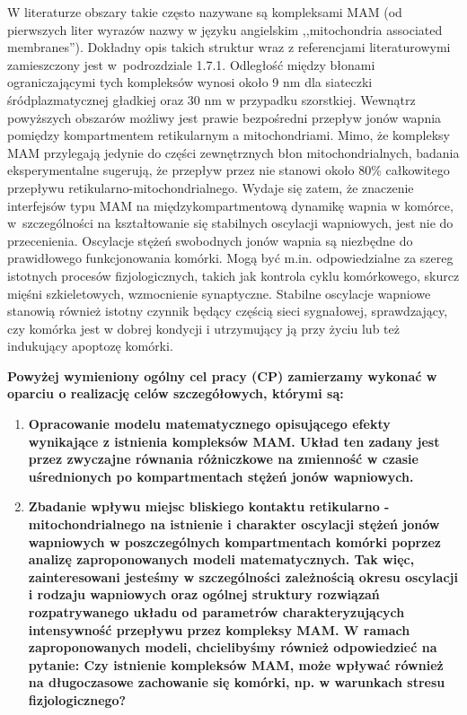 W literaturze obszary takie często nazywane są kompleksami MAM (od pierwszych liter wyrazów nazwy w języku angielskim ,,mitochondria associated membranes''). Dokładny opis takich struktur wraz z referencjami literaturowymi  zamieszczony jest w~podrozdziale 1.7.1. Odległość między błonami ograniczającymi tych kompleksów wynosi około 9 nm dla siateczki śródplazmatycznej gładkiej oraz 30 nm w przypadku szorstkiej. Wewnątrz powyższych obszarów możliwy jest prawie bezpośredni przepływ jonów wapnia pomiędzy kompartmentem retikularnym a mitochondriami. Mimo, że kompleksy MAM przylegają jedynie do części zewnętrznych błon mitochondrialnych, badania eksperymentalne sugerują, że przepływ przez nie stanowi około 80\% całkowitego przepływu retikularno-mitochondrialnego. Wydaje się zatem, że znaczenie interfejsów typu MAM na międzykompartmentową dynamikę wapnia w komórce, w~szczególności na kształtowanie się stabilnych oscylacji wapniowych,  jest nie do przecenienia. Oscylacje stężeń swobodnych  jonów wapnia  są niezbędne do prawidłowego funkcjonowania komórki. Mogą być m.in. odpowiedzialne za szereg istotnych procesów fizjologicznych, takich jak kontrola cyklu komórkowego, skurcz mięśni szkieletowych, wzmocnienie synaptyczne. Stabilne oscylacje wapniowe stanowią również istotny czynnik będący częścią  sieci sygnałowej, sprawdzający, czy komórka jest w dobrej kondycji i utrzymujący ją przy życiu lub też indukujący apoptozę komórki. 

\bigskip

\textbf{Powyżej wymieniony ogólny cel pracy (CP)  zamierzamy wykonać w oparciu o realizację celów szczegółowych, którymi są:}

\begin{enumerate}
\item \textbf{Opracowanie modelu matematycznego opisującego efekty wynikające z istnienia kompleksów MAM.  Układ ten zadany jest  przez zwyczajne równania różniczkowe na zmienność w czasie uśrednionych po kompartmentach stężeń jonów wapniowych. }

\item \textbf{Zbadanie wpływu miejsc bliskiego kontaktu retikularno - mitochondrialnego na istnienie i charakter oscylacji stężeń jonów wapniowych w poszczególnych kompartmentach  komórki poprzez analizę zaproponowanych modeli matematycznych.  Tak więc, zainteresowani jesteśmy  w szczególności  zależnością  okresu  oscylacji i rodzaju wapniowych oraz ogólnej struktury rozwiązań rozpatrywanego układu od parametrów charakteryzujących intensywność przepływu przez kompleksy MAM. W ramach zaproponowanych modeli, chcielibyśmy również odpowiedzieć na pytanie: Czy istnienie kompleksów MAM, może wpływać również na długoczasowe zachowanie się komórki, np.  w warunkach stresu fizjologicznego?}
\end{enumerate}

